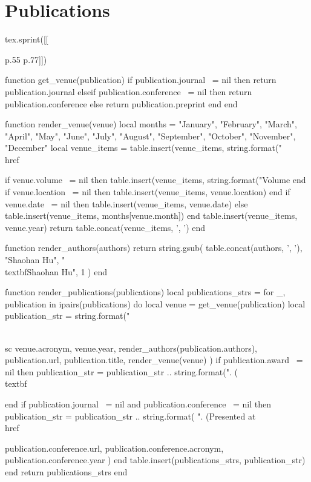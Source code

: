 \section{\sc Publications}

\begin{luacode*}
tex.sprint([[\begin{longtabu}{p{.55\sectionwidth} p{.77\resumewidth}}]])

function get_venue(publication)
    if publication.journal ~= nil then
        return publication.journal
    elseif publication.conference ~= nil then
        return publication.conference
    else
        return publication.preprint
    end
end

function render_venue(venue)
    local months = {"January", "February", "March", "April", "May", "June", "July", "August", "September", "October", "November", "December"}
    local venue_items = {}
    table.insert(venue_items, string.format("\\href{%s}{\\textsf{%
    if venue.volume ~= nil then
        table.insert(venue_items, string.format("Volume %
    end
    if venue.location ~= nil then
        table.insert(venue_items, venue.location)
    end
    if venue.date ~= nil then
        table.insert(venue_items, venue.date)
    else
        table.insert(venue_items, months[venue.month])
    end
    table.insert(venue_items, venue.year)
    return table.concat(venue_items, ', ')
end

function render_authors(authors)
    return string.gsub(
        table.concat(authors, ', '),
        "Shaohan Hu",
        "\\textbf{Shaohan Hu}",
        1
    )
end

function render_publications(publications)
    local publications_strs = {}
    for _, publication in ipairs(publications)
    do
        local venue = get_venue(publication)
        local publication_str = string.format("{\\sc %
            venue.acronym,
            venue.year,
            render_authors(publication.authors),
            publication.url,
            publication.title,
            render_venue(venue)
        )
        if publication.award ~= nil then
            publication_str = publication_str .. string.format(". (\\textbf{%
        end
        if publication.journal ~= nil and publication.conference ~= nil then
            publication_str = publication_str .. string.format(
                ". (Presented at \\href{%s}{\\textsf{\\sc %
                publication.conference.url,
                publication.conference.acronym,
                publication.conference.year
            )
        end
        table.insert(publications_strs, publication_str)
    end
    return publications_strs
end

}}}}
\end{longtabu}
\end{luacode*}
